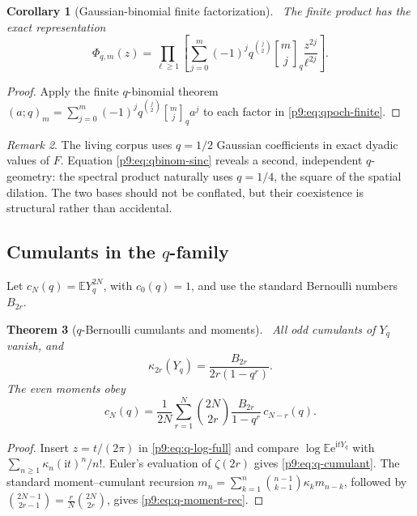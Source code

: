 \documentclass[11pt]{article}
\numberwithin{equation}{section}
\newtheorem{theorem}{Theorem}[section]
\newtheorem{corollary}[theorem]{Corollary}
\theoremstyle{definition}
\theoremstyle{remark}
\newtheorem{remark}[theorem]{Remark}
\newcommand{\E}{\mathbb E}
\newcommand{\e}{\mathrm e}
\newcommand{\ii}{\mathrm i}
\newcommand{\qbinom}[3]{\genfrac{[}{]}{0pt}{}{#1}{#2}_{#3}}
\begin{document}
\begin{corollary}[Gaussian-binomial finite factorization]\label{p9:cor:qbinom-finite}
\statusN\ The finite product has the exact representation
\begin{equation}
 \boxed{
 \Phi_{q,m}(z)=\prod_{\ell\ge1}
 \left[
  \sum_{j=0}^{m}(-1)^jq^{\binom j2}\qbinom mjq\frac{z^{2j}}{\ell^{2j}}
 \right].}                                                  \label{p9:eq:qbinom-sinc}
\end{equation}
\end{corollary}

\begin{proof}
Apply the finite $q$-binomial theorem
$(a;q)_m=\sum_{j=0}^m(-1)^jq^{\binom j2}\qbinom mjq a^j$
to each factor in \eqref{p9:eq:qpoch-finite}.
\end{proof}

\begin{remark}
The living corpus uses $q=1/2$ Gaussian coefficients in exact dyadic values of $F$.
Equation \eqref{p9:eq:qbinom-sinc} reveals a second, independent $q$-geometry: the spectral
product naturally uses $q=1/4$, the square of the spatial dilation.  The two bases should
not be conflated, but their coexistence is structural rather than accidental.
\end{remark}

\subsection{Cumulants in the $q$-family}
Let $c_N(q)=\E Y_q^{2N}$, with $c_0(q)=1$, and use the standard Bernoulli numbers
$B_{2r}$.

\begin{theorem}[$q$-Bernoulli cumulants and moments]\label{p9:thm:q-cumulants}
\statusN\ All odd cumulants of $Y_q$ vanish, and
\begin{equation}
 \boxed{\kappa_{2r}(Y_q)=\frac{B_{2r}}{2r(1-q^r)}.}         \label{p9:eq:q-cumulant}
\end{equation}
The even moments obey
\begin{equation}
 \boxed{
 c_N(q)=\frac1{2N}\sum_{r=1}^{N}
 \binom{2N}{2r}\frac{B_{2r}}{1-q^r}\,c_{N-r}(q).}         \label{p9:eq:q-moment-rec}
\end{equation}
\end{theorem}

\begin{proof}
Insert $z=t/(2\pi)$ in \eqref{p9:eq:q-log-full} and compare
$\log\E\e^{\ii tY_q}$ with
$\sum_{n\ge1}\kappa_n(\ii t)^n/n!$.  Euler's evaluation of $\zeta(2r)$ gives
\eqref{p9:eq:q-cumulant}.  The standard moment--cumulant recursion
$m_n=\sum_{k=1}^n\binom{n-1}{k-1}\kappa_km_{n-k}$, followed by
$\binom{2N-1}{2r-1}=\frac rN\binom{2N}{2r}$, gives
\eqref{p9:eq:q-moment-rec}.
\end{proof}
\end{document}
